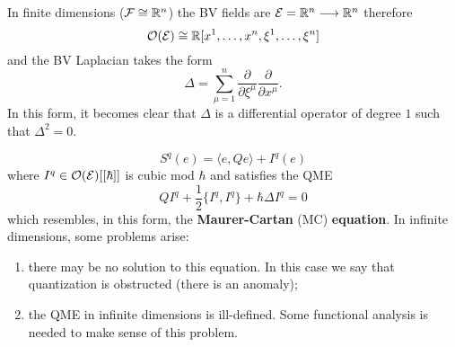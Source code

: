 \begin{example}
  In finite dimensions ($\mathcal{F} \cong \mathbb{R}^n$) the BV fields are
  $\mathcal{E} = \mathbb{R}^n \longrightarrow \mathbb{R}^n$
  therefore
  \begin{equation*}
    \mathcal{O}(\mathcal{E}) \cong \mathbb{R} [x^1, \dots, x^n, \xi^1, \dots, \xi^n]
  \end{equation*}
  and the BV Laplacian takes the form
  \begin{equation*}
    \Delta = \sum_{\mu = 1}^n \frac{\partial}{\partial \xi^\mu} \frac{\partial}{\partial x^\mu}.
  \end{equation*}
  In this form, it becomes clear that $\Delta$ is a differential operator of degree $1$ such that $\Delta^2 = 0$.
\end{example}
\begin{equation*}
  S^q(e) = \langle e, Qe \rangle
  + I^q(e)
\end{equation*}
where $I^q \in \mathcal{O}(\mathcal{E}) [[\hbar]]$ is cubic mod $\hbar$ and satisfies the QME
\begin{equation*}
  Q I^q + \frac{1}{2} \{I^q, I^q\} + \hbar \Delta I^q = 0
\end{equation*}
which resembles, in this form, the \textbf{Maurer-Cartan} (MC) \textbf{equation}. In infinite dimensions, some problems arise:

\begin{enumerate}
  \item there may be no solution to this equation. In this case we say that quantization is obstructed (there is an anomaly);
  \item the QME in infinite dimensions is ill-defined. Some functional analysis is needed to make sense of this problem.
\end{enumerate}
